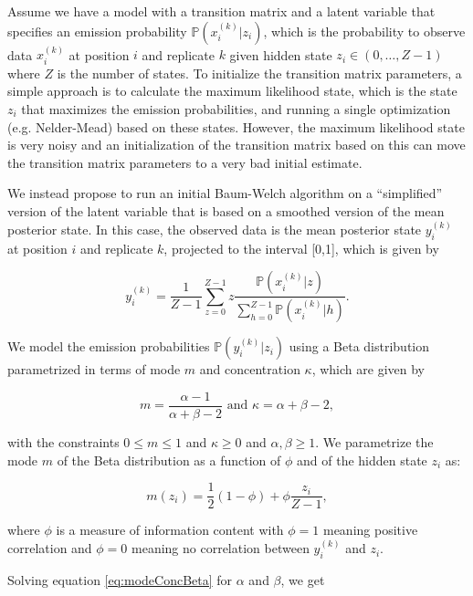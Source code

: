 \documentclass[a4paper,11pt]{article}
\def\p{\mathbb{P}}
\begin{document}
Assume we have a model with a transition matrix and a latent variable that specifies an emission probability $\p(x_{i}^{(k)} | z_i)$, which is the probability to observe data $x_{i}^{(k)}$ at position $i$ and replicate $k$ given hidden state $z_i \in (0, \ldots, Z-1)$ where $Z$ is the number of states. To initialize the transition matrix parameters, a simple approach is to calculate the maximum likelihood state, which is the state $z_i$ that maximizes the emission probabilities, and running a single optimization (e.g. Nelder-Mead) based on these states. However, the maximum likelihood state is very noisy and an initialization of the transition matrix based on this can move the transition matrix parameters to a very bad initial estimate.

We instead propose to run an initial Baum-Welch algorithm on a ``simplified'' version of the latent variable that is based on a smoothed version of the mean posterior state. In this case, the observed data is the mean posterior state $y_{i}^{(k)}$ at position $i$ and replicate $k$, projected to the interval [0,1], which is given by

\begin{equation*}
 y_{i}^{(k)} = \frac{1}{Z-1}\sum_{z=0}^{Z-1} z \frac{\p(x_{i}^{(k)} | z)}{\sum_{h=0}^{Z-1} \p(x_{i}^{(k)} | h)}.
\end{equation*}

We model the emission probabilities $\p(y_{i}^{(k)} | z_i)$ using a Beta distribution parametrized in terms of mode $m$ and concentration $\kappa$, which are given by

\begin{equation}\label{eq:modeConcBeta}
 m = \frac{\alpha-1}{\alpha + \beta -2} \mbox{ and }  \kappa = \alpha + \beta - 2,
\end{equation}

with the constraints $0 \leq m \leq 1$ and $\kappa \geq 0$ and $\alpha, \beta \geq 1$.
We parametrize the mode $m$ of the Beta distribution as a function of $\phi$ and of the hidden state $z_i$ as:

\begin{equation*}
 m(z_i) = \frac{1}{2} (1 - \phi) + \phi \frac{z_i}{Z-1},
\end{equation*}

where $\phi$ is a measure of information content with $\phi = 1$ meaning positive correlation and $\phi = 0$ meaning no correlation between $y_{i}^{(k)}$ and $z_i$.

Solving equation \eqref{eq:modeConcBeta} for $\alpha$ and $\beta$, we get
\end{document}
